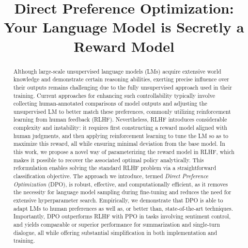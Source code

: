 \title{Direct Preference Optimization: Your Language Model is Secretly a Reward Model}

\begin{abstract}
Although large-scale unsupervised language models (LMs) acquire extensive world knowledge and demonstrate certain reasoning abilities, exerting precise influence over their outputs remains challenging due to the fully unsupervised approach used in their training. Current approaches for enhancing such controllability typically involve collecting human-annotated comparisons of model outputs and adjusting the unsupervised LM to better match these preferences, commonly utilizing reinforcement learning from human feedback (RLHF). Nevertheless, RLHF introduces considerable complexity and instability: it requires first constructing a reward model aligned with human judgments, and then applying reinforcement learning to tune the LM so as to maximize this reward, all while ensuring minimal deviation from the base model. In this work, we propose a novel way of parameterizing the reward model in RLHF, which makes it possible to recover the associated optimal policy analytically. This reformulation enables solving the standard RLHF problem via a straightforward classification objective. The approach we introduce, termed \textit{Direct Preference Optimization} (DPO), is robust, effective, and computationally efficient, as it removes the necessity for language model sampling during fine-tuning and reduces the need for extensive hyperparameter search. Empirically, we demonstrate that DPO is able to adapt LMs to human preferences as well as, or better than, state-of-the-art techniques. Importantly, DPO outperforms RLHF with PPO in tasks involving sentiment control, and yields comparable or superior performance for summarization and single-turn dialogue, all while offering substantial simplification in both implementation and training.
\end{abstract}

